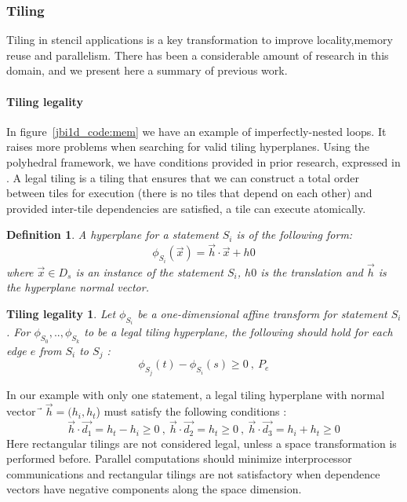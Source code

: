 \documentclass[a4paper,11pt]{article}
\begin{document}
\subsubsection{Tiling}
  Tiling in stencil applications is a key transformation to improve locality,memory reuse
  and parallelism. There has been a considerable amount of research in this domain, and
  we present here a summary of previous work.
  
  \newtheorem{depsdef}{Definition}
  \newtheorem{legality}{Tiling legality}
  
  \paragraph{Tiling legality} In figure~\ref{jbi1d_code:mem} we have an example of imperfectly-nested loops. It raises
  more problems when searching for valid tiling hyperplanes. Using the polyhedral framework, 
  we have conditions provided in prior research, expressed in \cite{bondhugula_automatic_2008}. A legal tiling is a 
  tiling that ensures that we can construct a total order between tiles for execution 
  (there is no tiles that depend on each other) and provided inter-tile dependencies
  are satisfied, a tile can execute atomically.
  \begin{depsdef}
    A hyperplane for a statement $S_i$ is of the following form:
      \[\phi_{S_i}(\vec{x}) =  \vec{h} \cdot \vec{x} + h0 \]
  where $ \vec{x} \in D_s$ is an instance of the statement $S_i$, 
  $h0$ is the translation and $\vec{h}$ is the hyperplane normal vector.
  \end{depsdef}
  
  \begin{legality}
    Let $\phi_{S_i}$ be a one-dimensional affine transform for statement
    $S_i$. For ${\phi_{S_0} , .., \phi_{S_k}}$ to be a legal tiling hyperplane, 
    the following should hold for each edge $e$ from $S_i$ to $S_j$ :
    \[\phi_{S_j}(t) − \phi_{S_i}(s) \geq 0 \ , \ P_e\]
  \end{legality}
  In our example with only one statement, a legal tiling hyperplane with normal vector
  $⃗\vec{h} = (h_i, h_t$) must satisfy the following conditions :
  \[\vec{h} \cdot \vec{d_1} = h_t − h_i \geq 0 \ , \ 
  \vec{h} \cdot \vec{d_2} = h_t \geq 0 \ , \ 
  \vec{h} \cdot \vec{d_3} = h_i + h_t \geq 0\]
  Here rectangular tilings are not considered legal, unless a space transformation is performed before.
  Parallel computations should minimize interprocessor communications and rectangular tilings are not 
  satisfactory when dependence vectors have negative components along the space dimension.
\end{document}
